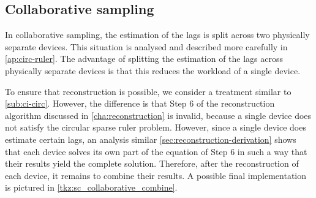 \documentclass[a4paper, openany, oneside]{memoir}
\begin{document}
\subsection{Collaborative sampling}
In collaborative sampling, the estimation of the lags is split across two physically separate devices. This situation is analysed and described more carefully in \cref{ap:circ-ruler}. The advantage of splitting the estimation of the lags across physically separate devices is that this reduces the workload of a single device. 

To ensure that reconstruction is possible, we consider a treatment similar to \cref{sub:ci-circ}. However, the difference is that Step 6 of the reconstruction algorithm discussed in \cref{cha:reconstruction} is invalid, because a single device does not satisfy the circular sparse ruler problem. However, since a single device does estimate certain lags, an analysis similar \cref{sec:reconstruction-derivation} shows that each device solves its own part of the equation of Step 6 in such a way that their results yield the complete solution. Therefore, after the reconstruction of each device, it remains to combine their results. A possible final implementation is pictured in \cref{tkz:sc_collaborative_combine}.
\end{document}
